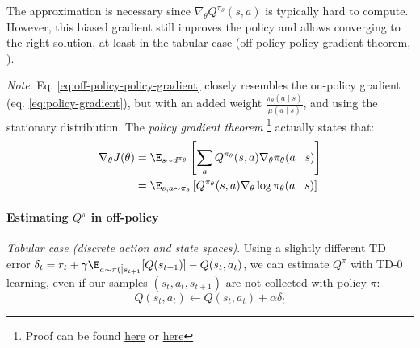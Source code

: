 The approximation is necessary since $\nabla_\theta Q^{\pi_\theta}(s,a)$ is typically hard to compute. However, this biased gradient still improves the policy and allows converging to the right solution, at least in the tabular case (off-policy policy gradient theorem, \cite{degris2012off}).

\emph{Note}. Eq. \ref{eq:off-policy-policy-gradient} closely resembles the on-policy gradient (eq. \ref{eq:policy-gradient}), but with an added weight $\frac{\pi_\theta(a\mid s)}{\mu(a\mid s)}$, and using the stationary distribution. 
The \emph{policy gradient theorem} \footnote{Proof can be found \href{https://lilianweng.github.io/lil-log/2018/04/08/policy-gradient-algorithms.html\#policy-gradient-theorem}{here} or \href{https://stanford.edu/~ashlearn/RLForFinanceBook/PolicyGradient.pdf}{here}} actually states that:
\begin{align}
    \nabla_\theta J(\theta)
    &= \E_{s\sim d^{\pi_\theta}} \left[ \sum_a Q^{\pi_\theta}(s,a) \nabla_\theta \pi_\theta(a\mid s) \right]
    \nonumber \\
    &= \E_{s,a\sim \pi_\theta} \left[ Q^{\pi_\theta}(s,a) \nabla_\theta \log \pi_\theta(a\mid s) \right]
\end{align}

\paragraph{Estimating $Q^\pi$ in off-policy}

\emph{Tabular case (discrete action and state spaces)}.
Using a slightly different TD error $\delta_t = r_t + \gamma \E_{a\sim \pi(\dot \mid s_{t+1}}[Q(s_{t+1})] - Q(s_t,a_t)$, we can estimate $Q^\pi$ with TD-0 learning, even if our samples $(s_t, a_t, s_{t+1})$ are not collected with policy $\pi$:
\[
Q(s_t, a_t) \leftarrow Q(s_t, a_t) + \alpha \delta_t
\]

